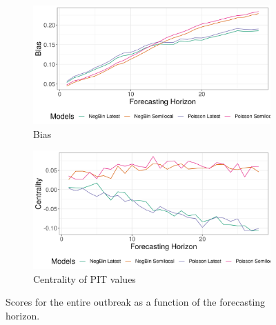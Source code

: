 \begin{figure}[H]
\begin{subfigure}{0.5\textwidth}
  \centering
  \includegraphics[width=\linewidth]{../output/Komanda_bias.png}  
  \caption{Bias}
  \label{fig:sub-third}
\end{subfigure}
\begin{subfigure}{0.5\textwidth}
  \centering
  \includegraphics[width=\linewidth]{../output/Komanda_centrality.png}  
  \caption{Centrality of PIT values}
  \label{fig:nat_scores_4}
\end{subfigure}
  \caption{Scores for the entire outbreak as a function of the forecasting horizon.}

  \label{fig:nat_scores}
\end{figure}
